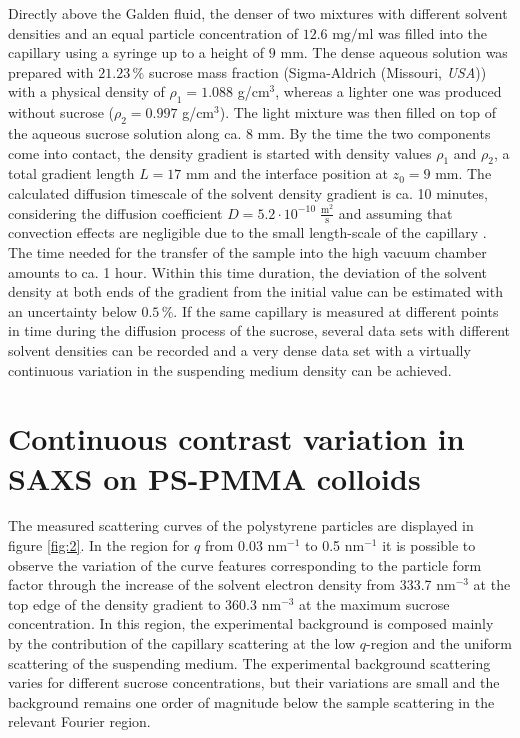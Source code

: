 Directly above the Galden fluid, the denser of two mixtures with different solvent densities and an equal particle concentration of \(12.6 \mbox{ mg/ml} \) was filled into the capillary using a syringe up to a height of  \(9\) mm. The dense aqueous solution was prepared with \( 21.23\,\%\) sucrose mass fraction (Sigma-Aldrich (Missouri, \emph{USA})) with a physical density of \(\rho_1=1.088 \) g/cm\(^3\), whereas a lighter one was produced without sucrose (\(\rho_2=0.997 \) g/cm\(^3\)). The light mixture was then filled on top of the aqueous sucrose solution along ca. \(8\) mm. By the time the two components come into contact, the density gradient is started with density values \(\rho_1\) and \(\rho_2\), a total gradient length \(L=17\) mm and the interface position at \(z_0=9\) mm. The calculated diffusion timescale of the solvent density gradient is ca. 10 minutes, considering the diffusion coefficient \(D=5.2 \cdot 10^{-10} \;\frac{\mbox{m}^2}{\mbox{s}}\) \citet{uedaira_sugar-water_1985,ribeiro_binary_2006} and assuming that convection effects are negligible due to the small length-scale of the capillary \citet{berberan-santos_barometric_1997}. The time needed for the transfer of the sample into the high vacuum chamber amounts to ca. 1 hour. Within this time duration, the deviation of the solvent density at both ends of the gradient from the initial value can be estimated with an uncertainty below \(0.5\,\%\). If the same capillary is measured at different points in time during the diffusion process of the sucrose, several data sets with different solvent densities can be recorded and a very dense data set with a virtually continuous variation in the suspending medium density can be achieved.

\section{Continuous contrast variation in SAXS on PS-PMMA colloids}
The measured scattering curves of the polystyrene particles are displayed in figure \ref{fig:2}. In the region for \(q\) from 0.03 nm\(^{-1}\) to 0.5 nm\(^{-1}\) it is possible to observe the variation of the curve features corresponding to the particle form factor through the increase of the solvent electron density from 333.7 nm\(^{-3}\) at the top edge of the density gradient to 360.3 nm\(^{-3}\) at the maximum sucrose concentration. In this region, the experimental background is composed mainly by the contribution of the capillary scattering at the low $q$-region and the uniform scattering of the suspending medium. The experimental background scattering varies for different sucrose concentrations, but their variations are small and the background remains one order of magnitude below the sample scattering in the relevant Fourier region.

